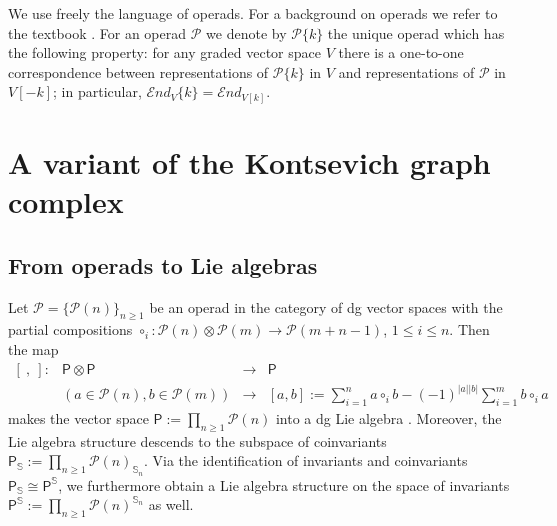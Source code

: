 \documentclass{amsart}
\theoremstyle{plain}
\theoremstyle{definition}
\begin{document}
We  use freely the language of operads. For a background on operads we refer to the textbook \cite{LV}.
For an operad ${{\mathcal P}}$ we denote by ${{\mathcal P}}\{k\}$ the unique operad which has the following property:
for any graded vector space $V$ there is a one-to-one correspondence between representations of
${{\mathcal P}}\{k\}$ in $V$ and representations of
${{\mathcal P}}$ in $V[-k]$; in particular, ${{\mathcal E}} nd_V\{k\}={{\mathcal E}} nd_{V[k]}$.

{\bigskip}

{\large
\section{\bf A variant of the Kontsevich graph complex}
}

{\bigskip}
\subsection{From operads to Lie algebras}
Let ${{\mathcal P}}=\{{{\mathcal P}}(n)\}_{n\geq 1}$ be an operad in the category of dg vector spaces with the partial compositions $\circ_i: {{\mathcal P}}(n){\otimes} {{\mathcal P}}(m) {\rightarrow} {{\mathcal P}}(m+n-1)$, $1\leq i\leq n$.
Then the map
$$
\begin{array}{rccc}
[\ ,\ ]:&  {{\mathsf P}} {\otimes} {{\mathsf P}} & {\longrightarrow} & {{\mathsf P}}\\
& (a\in {{\mathcal P}}(n), b\in {{\mathcal P}}(m)) & {\longrightarrow} &
[a, b]:= \sum_{i=1}^n a\circ_i b - (-1)^{|a||b|}\sum_{i=1}^m b\circ_i a
\end{array}
$$
makes the vector space
$
{{\mathsf P}}:= \prod_{n\geq 1}{{\mathcal P}}(n)$  
into a dg Lie algebra \cite{GV,KM}. Moreover, the Lie algebra structure descends to the subspace
of coinvariants ${{\mathsf P}}_{{\mathbb S}}:=  \prod_{n\geq 1}{{\mathcal P}}(n)_{{{\mathbb S}}_n}$. Via the identification of invariants and coinvariants ${{\mathsf P}}_{{\mathbb S}} \cong {{\mathsf P}}^{{\mathbb S}}$, we furthermore obtain a Lie algebra structure on the space of invariants
${{\mathsf P}}^{{\mathbb S}}:=  \prod_{n\geq 1}{{\mathcal P}}(n)^{{{\mathbb S}}_n}$ as well.
\end{document}
